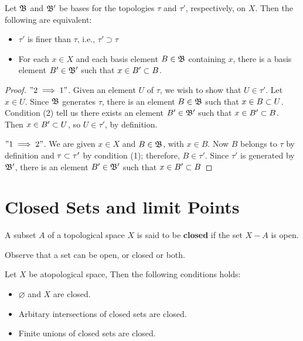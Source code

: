 \begin{lem}
	Let $\mathfrak{B} $ and $ \mathfrak{B'} $ be bases for the topologies $ \tau $ and $ \tau'$, respectively, on $X$. Then the following are equivalent:
	\begin{itemize}
		\item $ \tau' $ is finer than $ \tau $, i.e., $\tau' \supset \tau$
		\item For each $ x \in X$ and each basis element $B \in \mathfrak{B} $ containing $x$, there is a basis element $ B' \in \mathfrak{B'} $ such that $ x \in B' \subset B$.
	\end{itemize}
\end{lem}
\begin{proof}
	$" 2 \implies 1 " $. Given an element $U$ of $ \tau $, we wish to show that $ U \in \tau'$. Let $ x \in U $. Since $ \mathfrak{B} $ generates $\tau$, there is an element $ B \in \mathfrak{B} $ such that $ x \in B \subset U$. Condition (2) tell us there exists an element $ B' \in \mathfrak{B'} $ such that $x \in B'\subset B$. Then $x \in B'\subset U$, so $U \in \tau'$, by definition.
	
	$" 1 \implies 2 " $. We are given $ x \in X $ and $B \in \mathfrak{B} $, with $x \in B$. Now $B$ belongs to $ \tau $ by definition and $ \tau \subset \tau'$ by condition (1); therefore, $ B \in \tau'$. Since $ \tau'$ is generated by $ \mathfrak{B'}$, there is an element $ B'\in \mathfrak{B'}$ such that $ x \in B' \subset B$
\end{proof}


\section{Closed Sets and limit Points}

\begin{define}
	A subset $A$ of a topological space $X$ is said to be \textbf{closed} if the set $ X - A$ is open.
\end{define}

Observe that a set can be open, or closed or both.

\begin{thm}
	Let $X$ be atopological space, Then the following conditions holds:
	\begin{itemize}
		\item $ \varnothing $ and $X$ are closed.
		\item Arbitary intersections of closed sets are closed.
		\item Finite unions of closed sets are closed.
	\end{itemize}
\end{thm}

